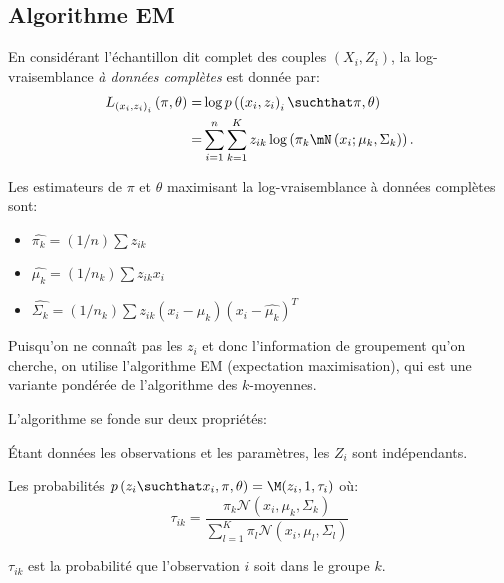 \documentclass[info, math, french]{mpb-cours}
\def\model#1#2{p\left(#1\suchthat#2\right)}
\def\define#1{\emph{\textcolor{vulm}{#1}}}
\begin{document}
\subsection{Algorithme EM}
\begin{definition}
	En considérant l'échantillon dit complet des couples $\left(X_{i}, Z_{i}\right)$, la log-vraisemblance \define{à données complètes} est donnée par:
	\begin{equation*}
		\begin{aligned}
			L_{\left(x_{i}, z_{i}\right)_{i}}\left(\pi, \theta\right) = & \log \model{\left(x_{i}, z_{i}\right)_{i}}{\pi, \theta}                                                 \\
			=                                                           & \sum_{i=1}^{n}\sum_{k = 1}^{K}z_{ik}\log\left(\pi_{k}\mN\left(x_{i}; \mu_{k}, \Sigma_{k}\right)\right).
		\end{aligned}
	\end{equation*}
\end{definition}

\begin{proposition}
	Les estimateurs de $\pi$ et $\theta$ maximisant la log-vraisemblance à données complètes sont:
	\begin{itemize}
		\item $\hat{\pi_{k}} = (1/n)\sum z_{ik}$
		\item $\hat{\mu_{k}} = (1/n_{k})\sum z_{ik}x_{i}$
		\item $\hat{\Sigma_{k}} = (1/n_{k})\sum z_{ik}(x_{i} - \hat{\mu_{k}})(x_{i} - \hat{\mu_{k}})^{T}$
	\end{itemize}
\end{proposition}

Puisqu'on ne connaît pas les $z_{i}$ et donc l'information de groupement qu'on cherche, on utilise l'algorithme EM (expectation maximisation), qui est une variante pondérée de l'algorithme des $k$-moyennes.

L'algorithme se fonde sur deux propriétés:
\begin{lemme}
	Étant données les observations et les paramètres, les $Z_{i}$ sont indépendants.
\end{lemme}
\begin{lemme}
	Les probabilités $\model{z_{i}}{x_{i}, \pi, \theta} = \M(z_{i}, 1, \tau_{i})$ où:
	\begin{equation*}
		\tau_{ik} = \frac{\pi_{k}\mathcal{N}(x_{i}, \mu_{k}, \Sigma_{k})}{\sum_{l = 1}^{K}\pi_{l}\mathcal{N}(x_{i}, \mu_{l}, \Sigma_{l})}
	\end{equation*}
\end{lemme}
$\tau_{ik}$ est la probabilité que l'observation $i$ soit dans le groupe $k$.
\end{document}
